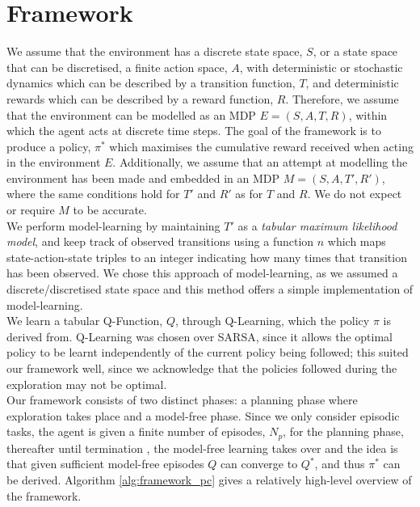 \section{Framework}
We assume that the environment has a discrete state space, $S$, or a state space that can be discretised, a finite action space, $A$, with deterministic or stochastic dynamics which can be described by a transition function, $T$, and deterministic rewards which can be described by a reward function, $R$. Therefore, we assume that the environment can be modelled as an MDP $E = (S, A, T, R)$, within which the agent acts at discrete time steps. The goal of the framework is to produce a policy, $\pi^*$ which maximises the cumulative reward received when acting in the environment $E$.
Additionally, we assume that an attempt at modelling the environment has been made and embedded in an MDP $M = (S, A, T', R')$, where the same conditions hold for $T'$ and $R'$ as for $T$ and $R$. We do not expect or require $M$ to be accurate. 
\\We perform model-learning by maintaining $T'$ as a \textit{tabular maximum likelihood model}, and keep track of observed transitions using a function $n$ which maps state-action-state triples to an integer indicating how many times that transition has been observed. We chose this approach of model-learning, as we assumed a discrete/discretised state space and this method offers a simple implementation of model-learning.
\\We learn a tabular Q-Function, $Q$, through Q-Learning, which the policy $\pi$ is derived from. Q-Learning was chosen over SARSA, since it allows the optimal policy to be learnt independently of the current policy being followed; this suited our framework well, since we acknowledge that the policies followed during the exploration may not be optimal.
\\Our framework consists of two distinct phases: a planning phase where exploration takes place and a model-free phase. Since we only consider episodic tasks, the agent is given a finite number of episodes, $N_p$, for the planning phase, thereafter until termination 
, the model-free learning takes over and the idea is that given sufficient model-free episodes $Q$ can converge to $Q^*$, and thus $\pi^*$ can be derived. Algorithm \ref{alg:framework_pc} gives a relatively high-level overview of the framework.


